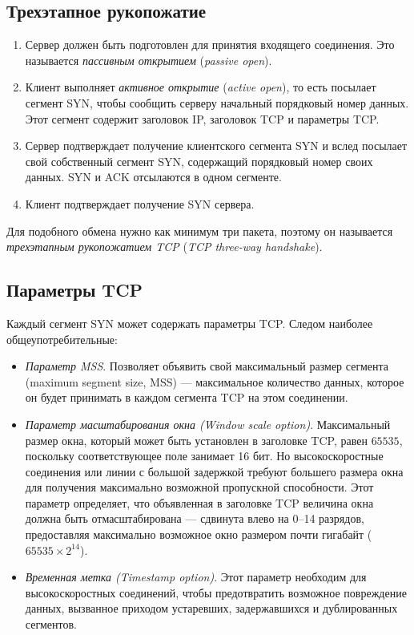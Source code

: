 \subsection{Трехэтапное рукопожатие}
\begin{enumerate}
  \item Сервер должен быть подготовлен для принятия входящего соединения. Это называется \emph{пассивным открытием} (\emph{passive open}).
  \item Клиент выполняет \emph{активное открытие} (\emph{active open}), то есть посылает сегмент SYN, чтобы сообщить серверу начальный порядковый номер данных. Этот сегмент содержит заголовок IP, заголовок TCP и параметры TCP.
  \item Сервер подтверждает получение клиентского сегмента SYN и вслед посылает свой собственный сегмент SYN, содержащий порядковый номер своих данных. SYN и ACK отсылаются в одном сегменте.
  \item Клиент подтверждает получение SYN сервера.
\end{enumerate}

Для подобного обмена нужно как минимум три пакета, поэтому он называется \emph{трехэтапным рукопожатием TCP} (\emph{TCP three-way handshake}).

\subsection{Параметры TCP}
Каждый сегмент SYN может содержать параметры TCP. Следом наиболее общеупотребительные:
\begin{itemize}
  \item \emph{Параметр MSS}. Позволяет объявить свой максимальный размер сегмента (maximum segment size, MSS) --- максимальное количество данных, которое он будет принимать в каждом сегмента TCP на этом соединении.
  \item \emph{Параметр масштабирования окна (Window scale option)}. Максимальный размер окна, который может быть установлен в заголовке TCP, равен $65535$, поскольку соответствующее поле занимает 16 бит. Но высокоскоростные соединения или линии с большой задержкой требуют большего размера окна для получения максимально возможной пропускной способности. Этот параметр определяет, что объявленная в заголовке TCP величина окна должна быть отмасштабирована --- сдвинута влево на 0--14 разрядов, предоставляя максимально возможное окно размером почти гигабайт ($65535 \times 2^{14}$).
  \item \emph{Временная метка (Timestamp option)}. Этот параметр необходим для высокоскоростных соединений, чтобы предотвратить возможное повреждение данных, вызванное приходом устаревших, задержавшихся и дублированных сегментов.
\end{itemize}

